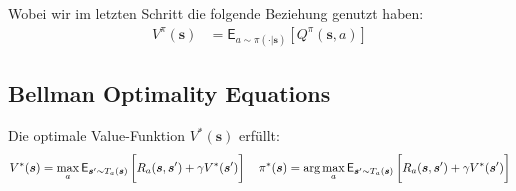     Wobei wir im letzten Schritt die folgende Beziehung genutzt haben:
    \begin{align*}
        V^{\pi}(\bm{s})
        &=
        \mathsf{E}_{a \sim \pi(\cdot|\bm{s})}
        \left[
            Q^{\pi}(\bm{s}, a)
        \right]
    \end{align*}

\subsection{Bellman Optimality Equations}

\begin{satz} \label{Bellman_Optimality_V}
    Die optimale Value-Funktion $V^*(\bm{s})$ erfüllt:
    \begin{align*}
        V^{*}(\bm{s})
        =
        \max_{a} \mathsf{E}_{\bm{s}' \sim T_a(\bm{s})}
        \left[
            \vphantom{\int}
            R_{a}(\bm{s}, \bm{s}') + \gamma V^{*}(\bm{s}')
        \right]
        \quad
        \pi^*(\bm{s}) 
        =
        \arg\max_{a} \mathsf{E}_{\bm{s}' \sim T_a(\bm{s})}
        \left[
            \vphantom{\int}
            R_{a}(\bm{s}, \bm{s}') + \gamma V^{*}(\bm{s}')
        \right]
    \end{align*}
\end{satz}

